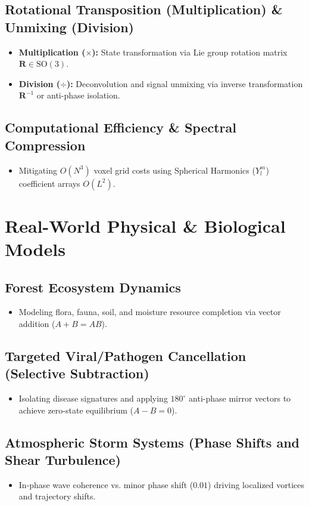 \documentclass[12pt, a4paper]{article}
\begin{document}
\subsection{Rotational Transposition (Multiplication) \& Unmixing (Division)}
\begin{itemize}
    \item \textbf{Multiplication ($\times$):} State transformation via Lie group rotation matrix $\mathbf{R} \in \mathrm{SO}(3)$.
    \item \textbf{Division ($\div$):} Deconvolution and signal unmixing via inverse transformation $\mathbf{R}^{-1}$ or anti-phase isolation.
\end{itemize}

\subsection{Computational Efficiency \& Spectral Compression}
\begin{itemize}
    \item Mitigating $O(N^3)$ voxel grid costs using Spherical Harmonics ($Y_l^m$) coefficient arrays $O(L^2)$.
\end{itemize}

\section{Real-World Physical \& Biological Models}
\subsection{Forest Ecosystem Dynamics}
\begin{itemize}
    \item Modeling flora, fauna, soil, and moisture resource completion via vector addition ($A + B = AB$).
\end{itemize}

\subsection{Targeted Viral/Pathogen Cancellation (Selective Subtraction)}
\begin{itemize}
    \item Isolating disease signatures and applying $180^\circ$ anti-phase mirror vectors to achieve zero-state equilibrium ($A - B = 0$).
\end{itemize}

\subsection{Atmospheric Storm Systems (Phase Shifts and Shear Turbulence)}
\begin{itemize}
    \item In-phase wave coherence vs. minor phase shift ($0.01$) driving localized vortices and trajectory shifts.
\end{itemize}
\end{document}
